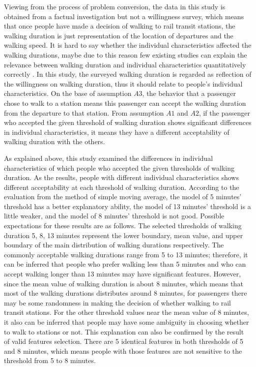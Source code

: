 \documentclass[sustainability,article,submit,moreauthors,pdftex,10pt,a4paper]{Definitions/mdpi}
\begin{document}
% 
Viewing from the process of problem conversion, the data in this study is obtained from a factual investigation but not a willingness survey, which means that once people have made a decision of walking to rail transit stations, the walking duration is just representation of the location of departures and the walking speed. It is hard to say whether the individual characteristics affected the walking durations, maybe due to this reason few existing studies can explain the relevance between walking duration and individual characteristics quantitatively correctly \cite{krygsman2004multimodal,levinson1997density,daniels2013explaining}. In this study, the surveyed walking duration is regarded as reflection of the willingness on walking duration, thus it should relate to people's individual characteristics. On the base of assumption $A3$, the behavior that a passenger chose to walk to a station means this passenger can accept the walking duration from the departure to that station. From assumption $A1$ and $A2$, if the passenger who accepted the given threshold of walking duration shows significant differences in individual characteristics, it means they have a different acceptability of walking duration with the others.

%
As explained above, this study examined the differences in individual characteristics of which people who accepted the given thresholds of walking duration. As the results, people with different individual characteristics shows different acceptability at each threshold of walking duration. According to the evaluation from the method of simple moving average, the model of 5 minutes’ threshold has a better explanatory ability, the model of 13 minutes' threshold is a little weaker, and the model of 8 minutes' threshold is not good. Possible expectations for these results are as follows. The selected thresholds of walking duration 5, 8, 13 minutes represent the lower boundary, mean value, and upper boundary of the main distribution of walking durations respectively. The commonly acceptable walking durations range from 5 to 13 minutes; therefore, it can be inferred that people who prefer walking less than 5 minutes and who can accept walking longer than 13 minutes may have significant features. However, since the mean value of walking duration is about 8 minutes, which means that most of the walking durations distributes around 8 minutes, for passengers there may be some randomness in making the decision of whether walking to rail transit stations. For the other threshold values near the mean value of 8 minutes, it also can be inferred that people may have some ambiguity in choosing whether to walk to stations or not. This explanation can also be confirmed by the result of valid features selection. There are 5 identical features in both thresholds of 5 and 8 minutes, which means people with those features are not sensitive to the threshold from 5 to 8 minutes.
\end{document}
